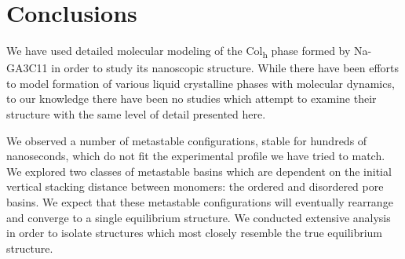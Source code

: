 \documentclass[journal=jpcbfk,manuscript=article]{achemso}
\begin{document}
 
  \section{Conclusions}
  
  We have used detailed molecular modeling of the Col\textsubscript{h} phase
  formed by Na-GA3C11 in order to study its nanoscopic structure. While there
  have been efforts to model formation of various liquid crystalline phases with
  molecular dynamics, to our knowledge there have been no studies which attempt
  to examine their structure with the same level of detail presented here.
  
  We observed a number of metastable configurations, stable for hundreds of 
  nanoseconds, which do not fit the experimental profile we have tried to match. 
  We explored two classes of metastable basins which are dependent on the initial
  vertical stacking distance between monomers: the ordered and disordered pore basins.
  We expect that these metastable configurations will eventually rearrange and converge
  to a single equilibrium structure. We conducted extensive analysis in order to 
  isolate structures which most closely resemble the true equilibrium structure.
\end{document}

